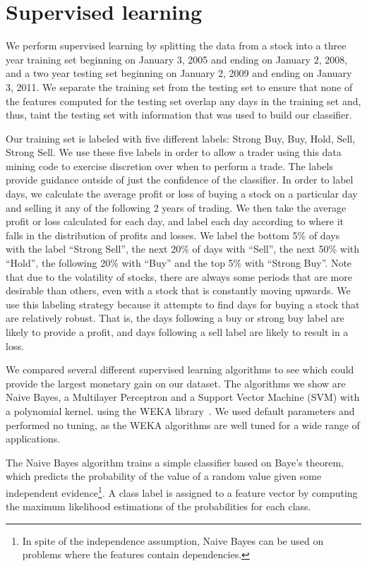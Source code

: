 \documentclass[10pt]{article}
\begin{document}
\section{Supervised learning}
\label{sec:supervisedlearning}

We perform supervised learning by splitting the data from a stock into a three
year training set beginning on January 3, 2005 and ending on January 2, 2008,
and a two year testing set beginning on January 2, 2009 and ending on January 3,
2011. We separate the training set from the testing set to ensure that none of the
features computed for the testing set overlap any days in the training set and,
thus, taint the testing set with information that was used to build our
classifier.

Our training set is labeled with five different labels: Strong Buy, Buy, Hold,
Sell, Strong Sell. We use these five labels in order to allow a trader using
this data mining code to exercise discretion over when to perform a trade.
The labels provide guidance outside of just the confidence of the classifier.
In order to label days, we calculate the average profit or loss of buying a
stock on a particular day and selling it any of the following 2 years of
trading. We then take the average profit or loss calculated for each day, and
label each day according to where it falls in the distribution of profits and
losses. We label the bottom 5\% of days with the label ``Strong Sell'', the
next 20\% of days with ``Sell'', the next 50\% with ``Hold'', the following
20\% with ``Buy'' and the top 5\% with ``Strong Buy''. Note that due to the
volatility of stocks, there are always some periods that are more desirable
than others, even with a stock that is constantly moving upwards. We use this
labeling strategy because it attempts to find days for buying a stock that are
relatively robust. That is, the days following a buy or strong buy label are
likely to provide a profit, and days following a sell label are likely to
result in a loss.

We compared several different supervised learning algorithms to see which could
provide the largest monetary gain on our dataset. The algorithms we show are
Naive Bayes, a Multilayer Perceptron and a Support Vector Machine
(SVM) with a polynomial kernel. using the WEKA library~\cite{Weka}. We used
default parameters and performed no tuning, as the WEKA algorithms are well
tuned for a wide range of applications.

The Naive Bayes algorithm trains a simple classifier based on Baye's theorem,
which predicts the probability of the value of a random value given some
independent evidence\footnote{In spite of the independence assumption, Naive
Bayes can be used on problems where the features contain dependencies.}. A
class label is assigned to a feature vector by computing the maximum
likelihood estimations of the probabilities for each class.
\end{document}
